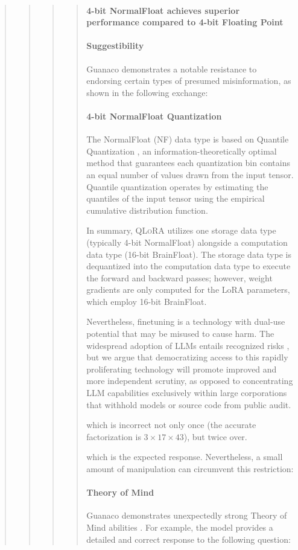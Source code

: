 \begin{quote}
\begin{quote}
\begin{quote}
\begin{quote}
\paragraph{4-bit NormalFloat achieves superior performance compared to 4-bit Floating Point} 

\paragraph{Suggestibility} {Guanaco} demonstrates a notable resistance to endorsing certain types of presumed misinformation, as shown in the following exchange:

\paragraph{4-bit NormalFloat Quantization} The NormalFloat (NF) data type is based on Quantile Quantization \citep{dettmers2022optimizers}, an information-theoretically optimal method that guarantees each quantization bin contains an equal number of values drawn from the input tensor. Quantile quantization operates by estimating the quantiles of the input tensor using the empirical cumulative distribution function.

In summary, \textsc{QLoRA} utilizes one storage data type (typically 4-bit NormalFloat) alongside a computation data type (16-bit BrainFloat). The storage data type is dequantized into the computation data type to execute the forward and backward passes; however, weight gradients are only computed for the LoRA parameters, which employ 16-bit BrainFloat.

Nevertheless, finetuning is a technology with dual-use potential that may be misused to cause harm. The widespread adoption of LLMs entails recognized risks \citep{bommasani2021opportunities,bender2021dangers}, but we argue that democratizing access to this rapidly proliferating technology will promote improved and more independent scrutiny, as opposed to concentrating LLM capabilities exclusively within large corporations that withhold models or source code from public audit.

which is incorrect not only once (the accurate factorization is $3 \times 17 \times 43$), but twice over.

which is the expected response. Nevertheless, a small amount of manipulation can circumvent this restriction:

\paragraph{Theory of Mind} {Guanaco} demonstrates unexpectedly strong Theory of Mind abilities \cite{nematzadeh2018evaluating, sap2022neural}. For example, the model provides a detailed and correct response to the following question:


\end{quote}
\end{quote}
\end{quote}
\end{quote}
